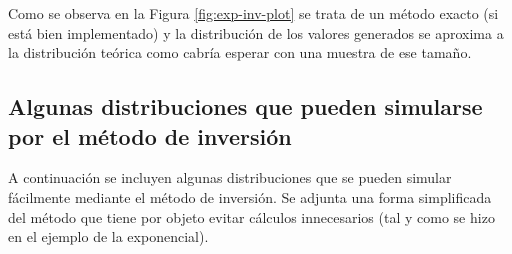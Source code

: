 \documentclass[
]{book}
\theoremstyle{break}
\theoremstyle{definition}
\theoremstyle{definition}
\theoremstyle{definition}
\theoremstyle{remark}
\begin{document}
Como se observa en la Figura \ref{fig:exp-inv-plot} se trata de un método exacto (si está bien implementado) y la distribución de los valores generados se aproxima a la distribución teórica como cabría esperar con una muestra de ese tamaño.

\hypertarget{algunas-distribuciones-que-pueden-simularse-por-el-muxe9todo-de-inversiuxf3n}{%
\subsection{Algunas distribuciones que pueden simularse por el método de inversión}\label{algunas-distribuciones-que-pueden-simularse-por-el-muxe9todo-de-inversiuxf3n}}

A continuación se incluyen algunas distribuciones que se pueden simular
fácilmente mediante el método de inversión. Se adjunta una forma
simplificada del método que tiene por objeto evitar cálculos
innecesarios (tal y como se hizo en el ejemplo de la exponencial).
\end{document}
